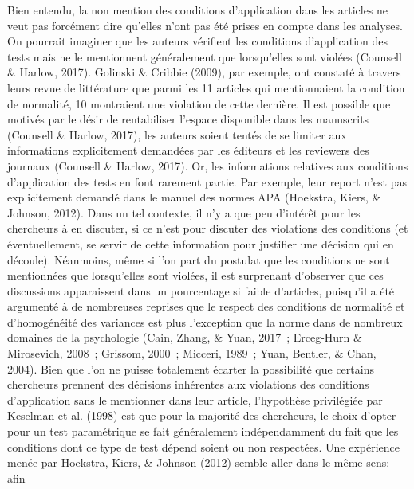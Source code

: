 \documentclass[
  12pt,
  french,
]{article}
\begin{document}
Bien entendu, la non mention des conditions d'application dans les
articles ne veut pas forcément dire qu'elles n'ont pas été prises en
compte dans les analyses. On pourrait imaginer que les auteurs vérifient
les conditions d'application des tests mais ne le mentionnent
généralement que lorsqu'elles sont violées (Counsell \& Harlow, 2017).
Golinski \& Cribbie (2009), par exemple, ont constaté à travers leurs
revue de littérature que parmi les 11 articles qui mentionnaient la
condition de normalité, 10 montraient une violation de cette dernière.
Il est possible que motivés par le désir de rentabiliser l'espace
disponible dans les manuscrits (Counsell \& Harlow, 2017), les auteurs
soient tentés de se limiter aux informations explicitement demandées par
les éditeurs et les reviewers des journaux (Counsell \& Harlow, 2017).
Or, les informations relatives aux conditions d'application des tests en
font rarement partie. Par exemple, leur report n'est pas explicitement
demandé dans le manuel des normes APA (Hoekstra, Kiers, \& Johnson,
2012).
Dans un tel contexte, il n'y a que peu d'intérêt pour les chercheurs à
en discuter, si ce n'est pour discuter des violations des conditions (et
éventuellement, se servir de cette information pour justifier une
décision qui en découle). Néanmoins, même si l'on part du postulat que
les conditions ne sont mentionnées que lorsqu'elles sont violées, il est
surprenant d'observer que ces discussions apparaissent dans un
pourcentage si faible d'articles, puisqu'il a été argumenté à de
nombreuses reprises que le respect des conditions de normalité et
d'homogénéité des variances est plus l'exception que la norme dans de
nombreux domaines de la psychologie (Cain, Zhang, \& Yuan, 2017~;
Erceg-Hurn \& Mirosevich, 2008~; Grissom, 2000~; Micceri, 1989~; Yuan,
Bentler, \& Chan, 2004). Bien que l'on ne puisse totalement écarter la
possibilité que certains chercheurs prennent des décisions inhérentes
aux violations des conditions d'application sans le mentionner dans leur
article, l'hypothèse privilégiée par Keselman et al. (1998) est que pour
la majorité des chercheurs, le choix d'opter pour un test paramétrique
se fait généralement indépendamment du fait que les conditions dont ce
type de test dépend soient ou non respectées. Une expérience menée par
Hoekstra, Kiers, \& Johnson (2012) semble aller dans le même sens: afin
\end{document}
